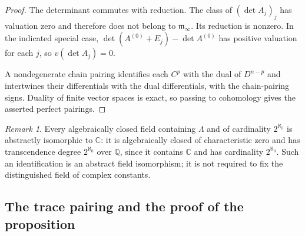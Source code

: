 \documentclass[11pt]{article}
\numberwithin{equation}{section}
\theoremstyle{definition}
\theoremstyle{remark}
\newtheorem{remark}[theorem]{Remark}
\begin{document}
\begin{proof}
The determinant commutes with reduction.  The class of
$(\det A_j)_j$ has valuation zero and therefore does not belong to
$\mathfrak m_\infty$.  Its reduction is nonzero.  In the indicated
special case,
$\det(A^{(0)}+E_j)-\det A^{(0)}$ has positive valuation for each
$j$, so $v(\det A_j)=0$.

A nondegenerate chain pairing identifies each $C^p$ with the dual of
$D^{n-p}$ and intertwines their differentials with the dual
differentials, with the chain-pairing signs.  Duality of finite
vector spaces is exact, so passing to cohomology gives the asserted
perfect pairings.
\end{proof}

\begin{remark}\label{rem:complex-coefficients}
Every algebraically closed field containing $\Lambda$ and of cardinality
$2^{\aleph_0}$ is abstractly isomorphic to $\mathbb C$: it is algebraically
closed of characteristic zero and has transcendence degree
$2^{\aleph_0}$ over $\mathbb Q$, since it contains $\mathbb C$ and has cardinality
$2^{\aleph_0}$.  Such an identification is an abstract field
isomorphism; it is not required to fix the distinguished field of
complex constants.
\end{remark}

\subsection{The trace pairing and the proof of the proposition}
\end{document}
